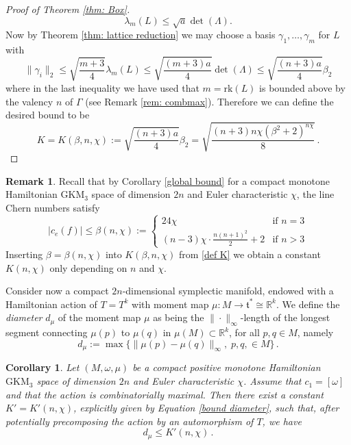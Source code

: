\documentclass[12pt,a4paper]{amsart}
\newcommand{\rk}{\mathrm{rk}}
\newcommand{\RR}{\mathbb{R}}
\newtheorem{cor}[thm]{Corollary}
\theoremstyle{plain}
\theoremstyle{definition}
\newtheorem{rem}[thm]{Remark}
\begin{document}
\begin{proof}[Proof of Theorem \ref{thm: Box}]
\[\lambda_m(L)\leq \sqrt{a}\det(\Lambda).\]
Now by Theorem \ref{thm: lattice reduction} we may choose a basis $\gamma_1,\ldots,\gamma_m$ for $L$ with
\[\|\gamma_i\|_2\leq \sqrt{\frac{m+3}{4}}\lambda_m(L)\leq  \sqrt{\frac{(m+3)a}{4}} \det(\Lambda)\leq  \sqrt{\frac{(n+3)a}{4}}\beta_2 \]
where in the last inequality we have used that $m=\rk(L)$ is bounded above by the valency $n$ of $\Gamma$ (see Remark \ref{rem: combmax}). Therefore we can define the desired bound to be
\begin{equation}\label{def K1}
K=K(\beta,n,\chi):=\sqrt{\frac{(n+3)a}{4}}\beta_2=\sqrt{\frac{(n+3)n\chi(\beta^2+2)^{{n\chi}}}{8}}\,.
\end{equation}

\end{proof}


\begin{rem}\label{rem: Knchi}
Recall that by Corollary \ref{global bound} for a compact monotone Hamiltonian GKM$_3$ space of dimension $2n$ and Euler characteristic $\chi$, the line Chern numbers satisfy
\begin{equation} 
\label{def beta n}
 |c_e(f)|\leq \beta(n,\chi):= \begin{cases} 
24\chi & \text{if  }n=3\\
(n-3)\chi \cdot\frac{n(n+1)^2}{2}+2 & \text{if  } n>3
\end{cases}\nonumber
\end{equation}
Inserting $\beta=\beta(n,\chi)$ into $K(\beta,n,\chi)$ from \eqref{def K} we obtain a constant $K(n,\chi)$ only depending on $n$ and $\chi$.
\end{rem}


Consider now a compact $2n$-dimensional symplectic manifold, endowed with a Hamiltonian
action of $T=T^k$ with moment map $\mu\colon M \to \mathfrak{t}^*\cong
\RR^k$. 
We define the \emph{diameter} $d_\mu$ of the moment map $\mu$ as being the
$\|\cdot\|_\infty$-length of the longest segment connecting $\mu(p)$ to $\mu(q)$ in
$\mu(M)\subset \RR^k$, for all $p,q\in M$, namely 
$$
d_\mu:=\max\{\|\mu(p)-\mu(q)\|_\infty, \;p,q,\in M\}\,.
$$

\begin{cor}\label{cor: box}
Let $(M,\omega,\mu)$ be a compact positive monotone Hamiltonian $\text{GKM}_3$ space of dimension $2n$ and Euler characteristic $\chi$.
Assume that $c_1=[\omega]$ and that the action is combinatorially maximal.
Then there exist a constant $K'=K'(n,\chi)$, explicitly given by Equation \eqref{bound
diameter}, such that, after potentially precomposing the action by an automorphism of
$T$, we have
\begin{equation}\label{diameter}
d_\mu\leq K'(n,\chi)\,.
\end{equation}
\end{cor}
\end{document}
